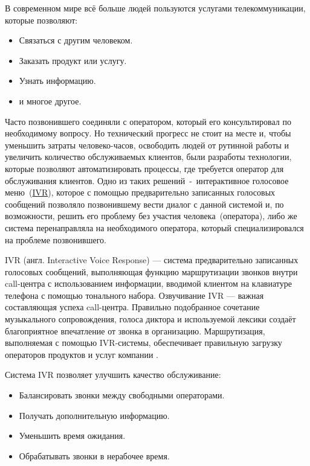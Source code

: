 
В современном мире всё больше людей пользуются услугами телекоммуникации, которые
позволяют:
\begin{itemize}
    \item Связаться с другим человеком.
    \item Заказать продукт или услугу.
    \item Узнать информацию.
    \item и многое другое.
\end{itemize}

Часто позвонившего соединяли с оператором, который его консультировал по необходимому
вопросу. Но технический прогресс не стоит на месте и, чтобы уменьшить
затраты человеко-часов, освободить людей от рутинной работы и увеличить
количество обслуживаемых клиентов, были разработы технологии, которые позволяют
автоматизировать процессы, где требуется оператор для обслуживания клиентов.
Одно из таких решений~-~интерактивное голосовое меню~(\hyperlink{ivr}{IVR}),
которое с помощью предварительно записанных голосовых сообщений позволяло
позвонившему вести диалог с данной системой и, по возможности, решить его проблему
без участия человека~(оператора), либо же система перенаправляла на необходимого
оператора, который специализировался на проблеме позвонившего.

IVR (англ. Interactive Voice Response) — система предварительно записанных
голосовых сообщений, выполняющая функцию маршрутизации звонков внутри call-центра
с использованием информации, вводимой клиентом на клавиатуре телефона с помощью
тонального набора. Озвучивание IVR — важная составляющая успеха call-центра.
Правильно подобранное сочетание музыкального сопровождения, голоса диктора и
используемой лексики создаёт благоприятное впечатление от звонка в организацию.
Маршрутизация, выполняемая с помощью IVR-системы, обеспечивает правильную загрузку
операторов продуктов и услуг компании \cite{ivr}.

Система IVR позволяет улучшить качество обслуживание:
\begin{itemize}
    \item Балансировать звонки между свободными операторами.
    \item Получать дополнительную информацию.
    \item Уменьшить время ожидания.
    \item Обрабатывать звонки в нерабочее время.
\end{itemize}

